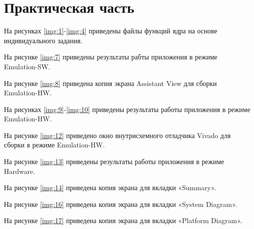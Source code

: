 \chapter{Практическая часть}

На рисунках \ref{img:1}-\ref{img:4} приведены файлы функций ядра на основе индивидуального задания.



\clearpage
На рисунке \ref{img:7} приведены результаты рабты приложения в режиме Emulation-SW.



\clearpage
На рисунке \ref{img:8} приведена копия экрана Assistant View для сборки Emulation-HW.



\clearpage
На рисунках \ref{img:9}-\ref{img:10} приведены результаты работы приложения в режиме Emulation-HW.





\clearpage
На рисунке \ref{img:12} приведено окно внутрисхемного отладчика Vivado для сборки в режиме Emulation-HW.



\clearpage
На рисунке \ref{img:13} приведены результаты работы приложения в режиме Hardware.



\clearpage
На рисунке \ref{img:14} приведена копия экрана для вкладки «Summary».



\clearpage
На рисунке \ref{img:16} приведена копия экрана для вкладки «System Diagram».


\clearpage
На рисунке \ref{img:17} приведена копия экрана для вкладки «Platform Diagram».


